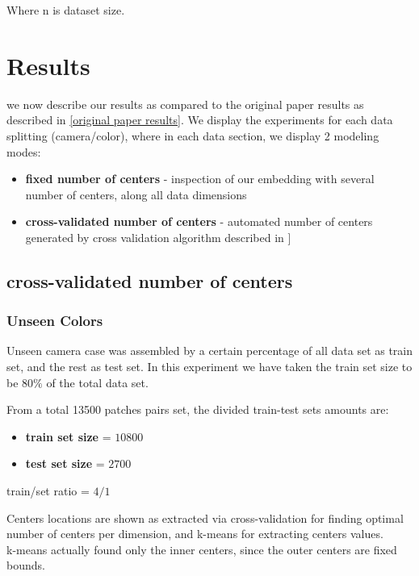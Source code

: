 Where n is dataset size. \\


\section{Results}

we now describe our results as compared to the original paper results as described in \ref{original paper results}.
We display the experiments for each data splitting (camera/color), where in each data section, we display 2 modeling modes:
\begin{itemize}
	\item \textbf{fixed number of centers} - inspection of our embedding with several number of centers, along all data dimensions
	\item \textbf{cross-validated number of centers} - automated number of centers generated by cross validation algorithm described in {]}
\end{itemize}



\subsection{cross-validated number of centers}
\subsubsection{Unseen Colors}

Unseen camera case was assembled by a certain percentage of all data set as train set, and the rest as test set. In this experiment we have taken the train set size to be $80 \%$ of the total data set.
		
		
			From a total 13500 patches pairs set, the divided train-test sets amounts are:
			\begin{itemize}
				\item \textbf{train set size} = $10800$ 
				\item \textbf{test set size} = $2700$
			\end{itemize}
			
			train/set ratio = $4/1$
			
		
		Centers locations are shown as extracted via cross-validation for finding optimal number of centers per dimension, and k-means for extracting centers values. \\
		k-means actually found only the inner centers, since the outer centers are fixed bounds.\\
		
